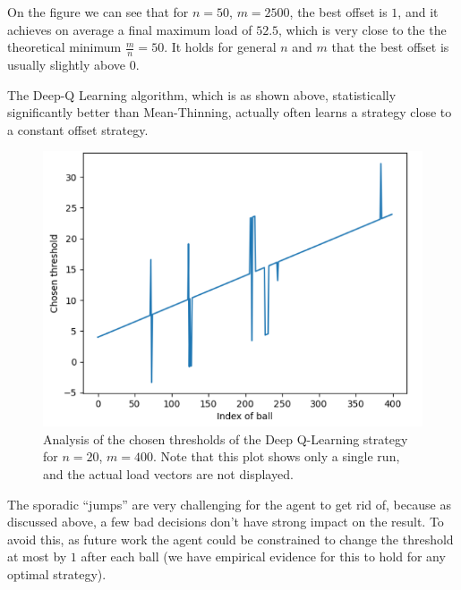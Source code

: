 
On the figure we can see that for $n=50$, $m=2500$, the best offset is $1$, and it achieves on average a final maximum load of $52.5$, which is very close to the the theoretical minimum $\frac{m}{n}=50$. It holds for general $n$ and $m$ that the best offset is usually slightly above $0$.

The Deep-Q Learning algorithm, which is as shown above, statistically significantly better than Mean-Thinning, actually often learns a strategy close to a constant offset strategy.


\begin{figure}[hbt!] \label{two-thinning-dqn-thresholds}
    \centering
    \includegraphics[scale=1.0]{Chapter4/Figs/dqn_learnt_thresholds.png}
    \caption{Analysis of the chosen thresholds of the Deep Q-Learning strategy for $n=20$, $m=400$. Note that this plot shows only a single run, and the actual load vectors are not displayed.}
\end{figure}



The sporadic ``jumps'' are very challenging for the agent to get rid of, because as discussed above, a few bad decisions don't have strong impact on the result. To avoid this, as future work the agent could be constrained to change the threshold at most by $1$ after each ball (we have empirical evidence for this to hold for any optimal strategy).



